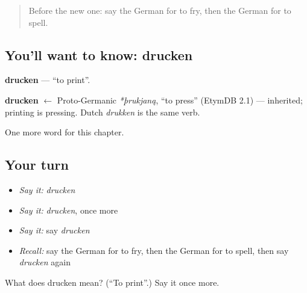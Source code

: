 \label{lesson:GE-C177-drucken}



\begin{quote}
Before the new one: say the German for to fry, then the German for to spell.
\end{quote}

\subsection*{You'll want to know: drucken}
\textbf{drucken} — \textquotedblleft{}to print\textquotedblright{}.

\begin{cousinweb}
\textbf{drucken} $\leftarrow$ Proto-Germanic \emph{*þrukjaną}, \textquotedblleft{}to press\textquotedblright{} (EtymDB 2.1) — inherited; printing is pressing. Dutch \emph{drukken} is the same verb.
\end{cousinweb}

\begin{grammarlens}[title={What you've built}]
One more word for this chapter.
\end{grammarlens}

\subsection*{Your turn}
\begin{itemize}
\raggedright
  \item \emph{Say it:} \emph{drucken}
  \item \emph{Say it:} \emph{drucken}, once more
  \item \emph{Say it:} say \emph{drucken}
  \item \emph{Recall:} say the German for to fry, then the German for to spell, then say \emph{drucken} again
\end{itemize}

\begin{tcolorbox}[breakable,colback=teal!4,colframe=teal!35!black,title={Before you move on}]
What does drucken mean? (\textquotedblleft{}To print\textquotedblright{}.) Say it once more.
\end{tcolorbox}
